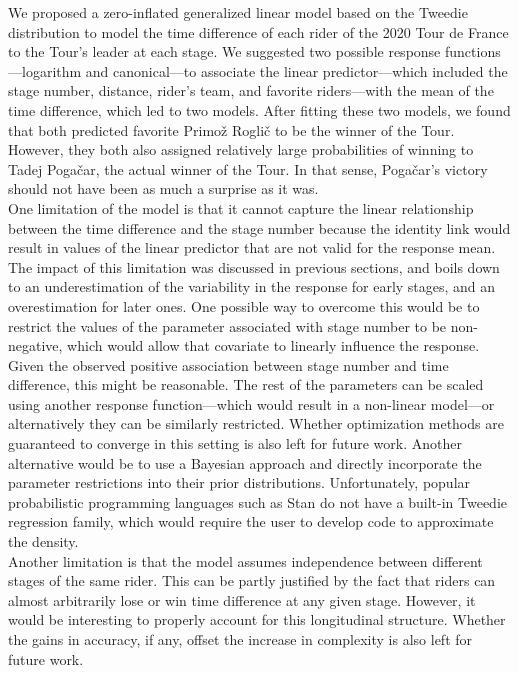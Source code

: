 \documentclass[aos,preprint]{imsart}
\begin{document}
We proposed a zero-inflated generalized linear model based on the Tweedie distribution to model the time difference of each rider of the 2020 Tour de France to the Tour's leader at each stage. We suggested two possible response functions---logarithm and canonical---to associate the linear predictor---which included the stage number, distance, rider's team, and favorite riders---with the mean of the time difference, which led to two models. After fitting these two models, we found that both predicted favorite Primož Roglič to be the winner of the Tour. However, they both also assigned relatively large probabilities of winning to Tadej Pogačar, the actual winner of the Tour. In that sense, Pogačar's victory should not have been as much a surprise as it was. \\


One limitation of the model is that it cannot capture the linear relationship between the time difference and the stage number because the identity link would result in values of the linear predictor that are not valid for the response mean. The impact of this limitation was discussed in previous sections, and boils down to an underestimation of the variability in the response for early stages, and an overestimation for later ones. One possible way to overcome this would be to restrict the values of the parameter associated with stage number to be non-negative, which would allow that covariate to linearly influence the response. Given the observed positive association between stage number and time difference, this might be reasonable. The rest of the parameters can be scaled using another response function---which would result in a non-linear model---or alternatively they can be similarly restricted. Whether optimization methods are guaranteed to converge in this setting is also left for future work. Another alternative would be to use a Bayesian approach and directly incorporate the parameter restrictions into their prior distributions. Unfortunately, popular probabilistic programming languages such as \textsf{Stan} do not have a built-in Tweedie regression family, which would require the user to develop code to approximate the density. \\


Another limitation is that the model assumes independence between different stages of the same rider. This can be partly justified by the fact that riders can almost arbitrarily lose or win time difference at any given stage. However, it would be interesting to properly account for this longitudinal structure. Whether the gains in accuracy, if any, offset the increase in complexity is also left for future work. \\
\end{document}
